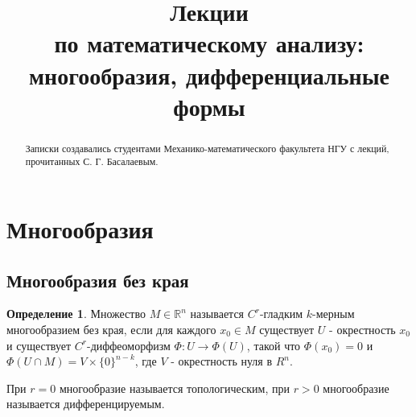 \documentclass[a5paper]{article}
\newcounter{through}
\theoremstyle{plain}
\theoremstyle{definition}
\newtheorem{definition}[through]{Определение}
\numberwithin{through}{section}
\numberwithin{equation}{section}
\begin{document}
	
	
	\title{Лекции \\
	по математическому анализу:\\
	многообразия, дифференциальные формы}
	\maketitle
	
	\begin{abstract}
		Записки создавались студентами Механико-математического факультета НГУ 
		с лекций, прочитанных С. Г. Басалаевым.
	\end{abstract}

\clearpage
\tableofcontents

\clearpage


\section{Многообразия}

\subsection{Многообразия без края}

\begin{definition}
	\label{ManifoldNoBoundary}
	Множество $M \in \mathbb{R}^n$ называется $C^r$-гладким $k$-мерным
	многообразием  без края, если для каждого $x_0 \in M$ существует $U$ - окрестность 
	$x_0$ и существует $ C^r$-диффеоморфизм $\Phi : U \to \Phi (U)$, такой что 
	$\Phi(x_0)=0$ и $\Phi(U \cap M) = V \times \{0\}^{n-k}$, где $V$ - окрестность нуля в $R^n$.
\end{definition}

При $r = 0$ многообразие называется топологическим, при $r > 0$ многообразие называется дифференцируемым.
\end{document}
